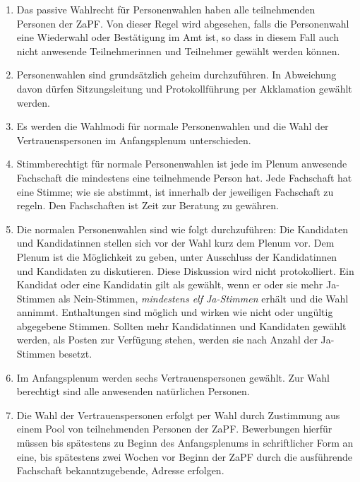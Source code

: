 \documentclass[12pt,oneside]{scrartcl}
\begin{document}
\begin{enumerate}
\item Das passive Wahlrecht für Personenwahlen haben alle teilnehmenden Personen
der ZaPF. Von dieser Regel wird abgesehen, falls die Personenwahl eine
Wiederwahl oder Bestätigung im Amt ist, so dass in diesem Fall auch nicht
anwesende Teilnehmerinnen und Teilnehmer gewählt werden können.

\item Personenwahlen sind grundsätzlich geheim durchzuführen.
In Abweichung davon dürfen Sitzungsleitung und Protokollführung per
Akklamation gewählt werden.

\item Es werden die Wahlmodi für normale Personenwahlen und die Wahl der
Vertrauenspersonen im Anfangsplenum unterschieden.

\item Stimmberechtigt für normale Personenwahlen ist jede im Plenum anwesende
Fachschaft die mindestens eine teilnehmende Person hat.
Jede Fachschaft hat eine Stimme; wie sie abstimmt, ist innerhalb der
jeweiligen Fachschaft zu regeln.
Den Fachschaften ist Zeit zur Beratung zu gewähren.

\item Die normalen Personenwahlen sind wie folgt durchzuführen:
Die Kandidaten und Kandidatinnen stellen sich vor der Wahl kurz dem
Plenum vor.
Dem Plenum ist die Möglichkeit zu geben, unter Ausschluss der Kandidatinnen
und Kandidaten zu diskutieren.
Diese Diskussion wird nicht protokolliert.
Ein Kandidat oder eine Kandidatin gilt als gewählt, wenn er oder sie mehr
Ja-Stimmen als Nein-Stimmen, \emph{mindestens elf Ja-Stimmen}
erhält und die Wahl annimmt.
Enthaltungen sind möglich und wirken wie nicht oder ungültig abgegebene
Stimmen.
Sollten mehr Kandidatinnen und Kandidaten gewählt werden, als Posten zur
Verfügung stehen, werden sie nach Anzahl der Ja-Stimmen besetzt.

\item Im Anfangsplenum werden sechs Vertrauenspersonen gewählt. Zur Wahl
berechtigt sind alle anwesenden natürlichen Personen.

\item Die Wahl der Vertrauenspersonen erfolgt per Wahl durch
Zustimmung aus einem Pool von teilnehmenden Personen der ZaPF.
Bewerbungen hierfür müssen bis spätestens zu Beginn des Anfangsplenums
in schriftlicher Form an eine, bis spätestens zwei Wochen vor Beginn der
ZaPF durch die ausführende Fachschaft bekanntzugebende, Adresse erfolgen.


\end{enumerate}
\end{document}
